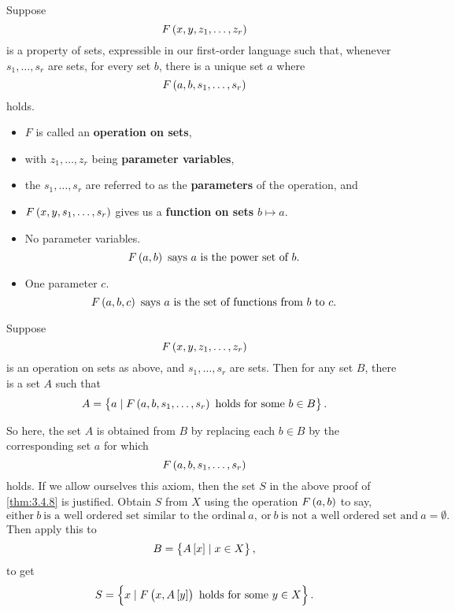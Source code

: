 \pagebreak

\begin{definition}
\label{def:3.4.9}
Suppose
$$ F\br{x, y, z_1, \dots, z_r} $$
is a property of sets, expressible in our first-order language such that, whenever $ s_1, \dots, s_r $ are sets, for every set $ b $, there is a unique set $ a $ where
$$ F\br{a, b, s_1, \dots, s_r} $$
holds.
\begin{itemize}
\item $ F $ is called an \textbf{operation on sets},
\item with $ z_1, \dots, z_r $ being \textbf{parameter variables},
\item the $ s_1, \dots, s_r $ are referred to as the \textbf{parameters} of the operation, and
\item $ F\br{x, y, s_1, \dots, s_r} $ gives us a \textbf{function on sets} $ b \mapsto a $.
\end{itemize}
\end{definition}

\begin{example*}
\hfill
\begin{itemize}
\item No parameter variables.
$$ F\br{a, b} \ \text{says} \ a \ \text{is the power set of} \ b. $$
\item One parameter $ c $.
$$ F\br{a, b, c} \ \text{says} \ a \ \text{is the set of functions from} \ b \ \text{to} \ c. $$
\end{itemize}
\end{example*}

\begin{axiom}
Suppose
$$ F\br{x, y, z_1, \dots, z_r} $$
is an operation on sets as above, and $ s_1, \dots, s_r $ are sets. Then for any set $ B $, there is a set $ A $ such that
$$ A = \cbr{a \mid F\br{a, b, s_1, \dots, s_r} \ \text{holds for some} \ b \in B}. $$
\end{axiom}

So here, the set $ A $ is obtained from $ B $ by replacing each $ b \in B $ by the corresponding set $ a $ for which
$$ F\br{a, b, s_1, \dots, s_r} $$
holds. If we allow ourselves this axiom, then the set $ S $ in the above proof of \ref{thm:3.4.8} is justified. Obtain $ S $ from $ X $ using the operation $ F\br{a, b} $ to say,
$$ \text{either} \ b \ \text{is a well ordered set similar to the ordinal} \ a, \ \text{or} \ b \ \text{is not a well ordered set and} \ a = \emptyset. $$
Then apply this to
$$ B = \cbr{A\sbr{x} \mid x \in X}, $$
to get
$$ S = \cbr{x \mid F\br{x, A\sbr{y}} \ \text{holds for some} \ y \in X}. $$

